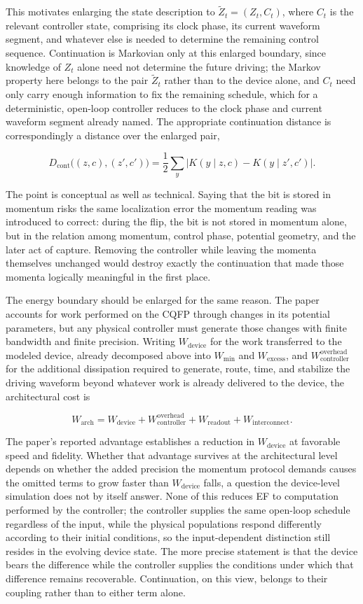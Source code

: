 \documentclass[11pt]{article}
\begin{document}
This motivates enlarging the state description to $\widetilde Z_t = (Z_t, C_t)$, where $C_t$ is the relevant controller state, comprising its clock phase, its current waveform segment, and whatever else is needed to determine the remaining control sequence. Continuation is Markovian only at this enlarged boundary, since knowledge of $Z_t$ alone need not determine the future driving; the Markov property here belongs to the pair $\widetilde Z_t$ rather than to the device alone, and $C_t$ need only carry enough information to fix the remaining schedule, which for a deterministic, open-loop controller reduces to the clock phase and current waveform segment already named. The appropriate continuation distance is correspondingly a distance over the enlarged pair,

\[
D_{\mathrm{cont}}\bigl((z,c),(z',c')\bigr) = \frac12\sum_y \bigl|K(y\mid z,c)-K(y\mid z',c')\bigr|.
\]

The point is conceptual as well as technical. Saying that the bit is stored in momentum risks the same localization error the momentum reading was introduced to correct: during the flip, the bit is not stored in momentum alone, but in the relation among momentum, control phase, potential geometry, and the later act of capture. Removing the controller while leaving the momenta themselves unchanged would destroy exactly the continuation that made those momenta logically meaningful in the first place.

The energy boundary should be enlarged for the same reason. The paper accounts for work performed on the CQFP through changes in its potential parameters, but any physical controller must generate those changes with finite bandwidth and finite precision. Writing $W_{\mathrm{device}}$ for the work transferred to the modeled device, already decomposed above into $W_{\min}$ and $W_{\mathrm{excess}}$, and $W_{\mathrm{controller}}^{\mathrm{overhead}}$ for the additional dissipation required to generate, route, time, and stabilize the driving waveform beyond whatever work is already delivered to the device, the architectural cost is

\[
W_{\mathrm{arch}} = W_{\mathrm{device}} + W_{\mathrm{controller}}^{\mathrm{overhead}} + W_{\mathrm{readout}} + W_{\mathrm{interconnect}}.
\]

The paper's reported advantage establishes a reduction in $W_{\mathrm{device}}$ at favorable speed and fidelity. Whether that advantage survives at the architectural level depends on whether the added precision the momentum protocol demands causes the omitted terms to grow faster than $W_{\mathrm{device}}$ falls, a question the device-level simulation does not by itself answer. None of this reduces EF to computation performed by the controller; the controller supplies the same open-loop schedule regardless of the input, while the physical populations respond differently according to their initial conditions, so the input-dependent distinction still resides in the evolving device state. The more precise statement is that the device bears the difference while the controller supplies the conditions under which that difference remains recoverable. Continuation, on this view, belongs to their coupling rather than to either term alone.
\end{document}
